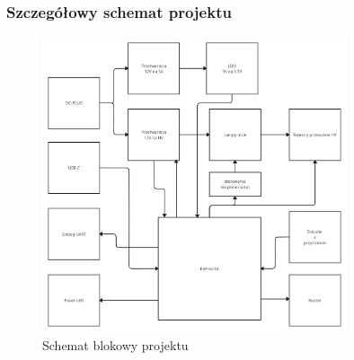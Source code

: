 \documentclass[../main.tex]{subfiles}
\begin{document}
\subsubsection{Szczegółowy schemat projektu}
\begin{figure}[H]
    \centering
    \includegraphics[width=0.8\textwidth]{schemat_blokowy.jpg}
    \caption{Schemat blokowy projektu}
    \label{fig:schemat_projektu}
\end{figure}
\end{document}
